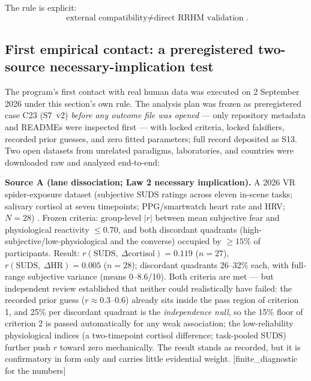 \documentclass[9pt,twocolumn]{article}
\newcommand{\tier}[1]{{\sffamily\scriptsize\color{RRHMSlate}[#1]}}
\begin{document}
The rule is explicit:
\[
\boxed{\text{external compatibility}\neq\text{direct RRHM validation}}.
\]

\subsection{First empirical contact: a preregistered two-source necessary-implication test}
\label{sec:firstcontact}
The program's first contact with real human data was executed on 2 September 2026 under this section's own rule. The analysis plan was frozen as preregistered case C23 (S7~v2) \emph{before any outcome file was opened} --- only repository metadata and READMEs were inspected first --- with locked criteria, locked falsifiers, recorded prior guesses, and zero fitted parameters; full record deposited as S13. Two open datasets from unrelated paradigms, laboratories, and countries were downloaded raw and analyzed end-to-end:

\textbf{Source A (lane dissociation; Law 2 necessary implication).} A 2026 VR spider-exposure dataset (subjective SUDS ratings across eleven in-scene tasks; salivary cortisol at seven timepoints; PPG/smartwatch heart rate and HRV; $N{=}28$) \cite{vrspider2026}. Frozen criteria: group-level $|r|$ between mean subjective fear and physiological reactivity $\le0.70$, and both discordant quadrants (high-subjective/low-physiological and the converse) occupied by $\ge15\%$ of participants. Result: $r(\mathrm{SUDS},\ \Delta\mathrm{cortisol})=0.119$ ($n{=}27$), $r(\mathrm{SUDS},\ \Delta\mathrm{HR})=0.005$ ($n{=}28$); discordant quadrants 26--32\% each, with full-range subjective variance (means 0--8.6/10). Both criteria are met --- but independent review established that neither could realistically have failed: the recorded prior guess ($r\approx0.3$--$0.6$) already sits inside the pass region of criterion 1, and 25\% per discordant quadrant is the \emph{independence null}, so the 15\% floor of criterion 2 is passed automatically for any weak association; the low-reliability physiological indices (a two-timepoint cortisol difference; task-pooled SUDS) further push $r$ toward zero mechanically. The result stands as recorded, but it is confirmatory in form only and carries little evidential weight. \tier{finite\_diagnostic for the numbers}
\end{document}
